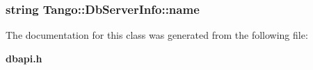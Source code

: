 \subsubsection[{name}]{\setlength{\rightskip}{0pt plus 5cm}string Tango\-::\-Db\-Server\-Info\-::name}\label{classTango_1_1DbServerInfo_a1a4201d68b83fa83167bceab6b6f18ff}


The documentation for this class was generated from the following file\-:\begin{DoxyCompactItemize}
\item 
{\bf dbapi.\-h}\end{DoxyCompactItemize}
